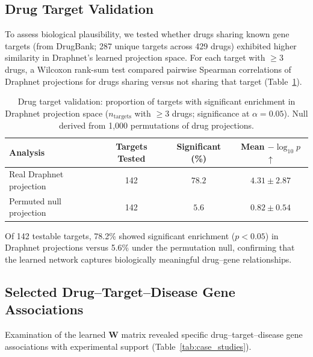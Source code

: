 \documentclass[11pt]{article}
\begin{document}
\subsection{Drug Target Validation}

To assess biological plausibility, we tested whether drugs sharing known gene targets (from DrugBank; 287 unique targets across 429 drugs) exhibited higher similarity in Draphnet's learned projection space. For each target with $\geq 3$ drugs, a Wilcoxon rank-sum test compared pairwise Spearman correlations of Draphnet projections for drugs sharing versus not sharing that target (Table~\ref{tab:target_validation}).

\begin{table}[H]
\centering
\caption{Drug target validation: proportion of targets with significant enrichment in Draphnet projection space ($n_{\mathrm{targets}}$ with $\geq 3$ drugs; significance at $\alpha = 0.05$). Null derived from 1,000 permutations of drug projections.}
\label{tab:target_validation}
\begin{tabular}{lccc}
\toprule
Analysis & Targets Tested & Significant (\%) & Mean $-\log_{10} p$ $\uparrow$ \\
\midrule
Real Draphnet projection & 142 & $78.2$ & $4.31 \pm 2.87$ \\
Permuted null projection & 142 & $5.6$ & $0.82 \pm 0.54$ \\
\bottomrule
\end{tabular}
\end{table}

Of 142 testable targets, 78.2\% showed significant enrichment ($p < 0.05$) in Draphnet projections versus 5.6\% under the permutation null, confirming that the learned network captures biologically meaningful drug--gene relationships.

\subsection{Selected Drug--Target--Disease Gene Associations}

Examination of the learned $\mathbf{W}$ matrix revealed specific drug--target--disease gene associations with experimental support (Table~\ref{tab:case_studies}).
\end{document}
